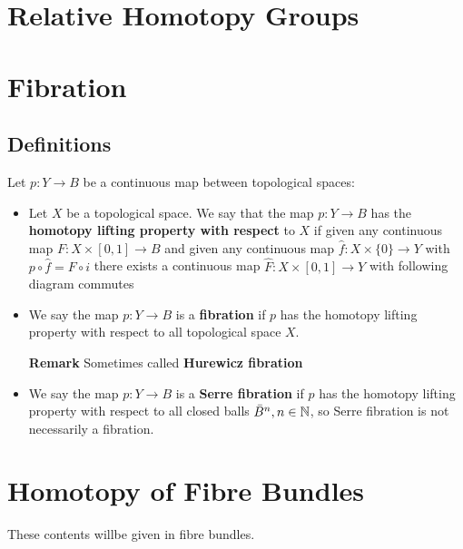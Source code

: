 \documentclass[Total.tex]{subfiles}
\begin{document}
		\section{Relative Homotopy Groups}
		\section{Fibration}
			\subsection{Definitions}
				\begin{Def}
					Let $p:Y\rightarrow B$ be a continuous map between topological spaces:
					\begin{itemize}
						\item Let $X$ be a topological space. We say that the map $p:Y\rightarrow B$ has the \textbf{homotopy lifting property with respect}  to $X$ if given any continuous map $F:X\times [0,1]\rightarrow B$ and given any continuous map $\hat{f}:X\times \{0\}\rightarrow Y$ with $p\circ\hat{f}=F\circ i$ there exists a continuous map $\hat{F}:X\times [0,1]\rightarrow Y$ with following diagram commutes
						\begin{center}
						\end{center}
						\item We say the map $p:Y\rightarrow B$ is a \textbf{fibration} if $p$ has the homotopy lifting property with respect to all topological space $X$.
						
						\textbf{Remark} Sometimes called \textbf{Hurewicz fibration}
						\item We say the map $p:Y\rightarrow B$ is a \textbf{Serre fibration} if $p$ has the homotopy lifting property with respect to all closed balls $\bar{B}^n,n\in \mathbb{N}$, so Serre fibration is not necessarily a fibration.
					\end{itemize}
				\end{Def}
				\section{Homotopy of Fibre Bundles}
				These contents willbe given in fibre bundles.
				
\end{document}
